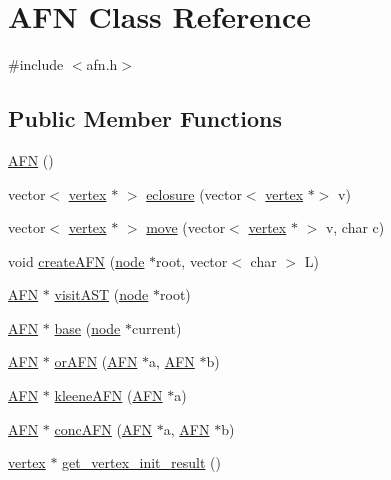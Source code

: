 \hypertarget{class_a_f_n}{}\section{A\+FN Class Reference}
\label{class_a_f_n}


{\ttfamily \#include $<$afn.\+h$>$}

\subsection*{Public Member Functions}
\begin{DoxyCompactItemize}
\item 
\hyperlink{class_a_f_n_a72fa47c40c80819e572ba78ae519a2d9}{A\+FN} ()
\item 
vector$<$ \hyperlink{structvertex}{vertex} $\ast$ $>$ \hyperlink{class_a_f_n_a7513af935008d76a552ba97d58138e52}{eclosure} (vector$<$ \hyperlink{structvertex}{vertex} $\ast$$>$ v)
\item 
vector$<$ \hyperlink{structvertex}{vertex} $\ast$ $>$ \hyperlink{class_a_f_n_a80056c10e4a822ebd9af81a6b30a6773}{move} (vector$<$ \hyperlink{structvertex}{vertex} $\ast$ $>$ v, char c)
\item 
void \hyperlink{class_a_f_n_a757046dcf9f6dddd5ce67716ed2c5857}{create\+A\+FN} (\hyperlink{structnode}{node} $\ast$root, vector$<$ char $>$ L)
\item 
\hyperlink{class_a_f_n}{A\+FN} $\ast$ \hyperlink{class_a_f_n_adcd40561f64a330de5974f4cb1d0de26}{visit\+A\+ST} (\hyperlink{structnode}{node} $\ast$root)
\item 
\hyperlink{class_a_f_n}{A\+FN} $\ast$ \hyperlink{class_a_f_n_ad4468eb7ea1fbf8a3d914c75984e0415}{base} (\hyperlink{structnode}{node} $\ast$current)
\item 
\hyperlink{class_a_f_n}{A\+FN} $\ast$ \hyperlink{class_a_f_n_a5b4f8dc87b5091fdd6f5373a1ad9d21c}{or\+A\+FN} (\hyperlink{class_a_f_n}{A\+FN} $\ast$a, \hyperlink{class_a_f_n}{A\+FN} $\ast$b)
\item 
\hyperlink{class_a_f_n}{A\+FN} $\ast$ \hyperlink{class_a_f_n_a4acf6ba775249f2b46e022fcb30746d7}{kleene\+A\+FN} (\hyperlink{class_a_f_n}{A\+FN} $\ast$a)
\item 
\hyperlink{class_a_f_n}{A\+FN} $\ast$ \hyperlink{class_a_f_n_acd49864e85e53873851b5cac06c7d04b}{conc\+A\+FN} (\hyperlink{class_a_f_n}{A\+FN} $\ast$a, \hyperlink{class_a_f_n}{A\+FN} $\ast$b)
\item 
\hyperlink{structvertex}{vertex} $\ast$ \hyperlink{class_a_f_n_a925f7daa4874270adb107f1c5f9aa16d}{get\+\_\+vertex\+\_\+init\+\_\+result} ()
$$
\end{DoxyCompactItemize}
